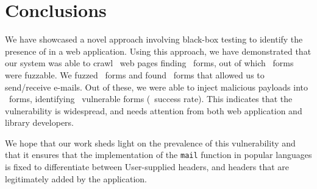\section{Conclusions}
\vspace{-2.5ex}
We have showcased a novel approach involving black-box testing to identify the presence of \ehi in a web application. Using this approach, we have demonstrated that our system was able to crawl \urls\ web pages finding \forms\ forms, out of which \emailforms\ forms were fuzzable. We fuzzed \fuzzed\ forms and found \recd\  forms that allowed us to send/receive e-mails. Out of these, we were able to inject malicious payloads into \malfuzzed\ forms, identifying \success\ vulnerable forms (\successDelta\ success rate). This indicates that the vulnerability is widespread, and needs attention from both web application and library developers. 

We hope that our work sheds light on the prevalence of this vulnerability and that it ensures that the implementation of the \texttt{mail} function in popular languages is fixed to differentiate between User-supplied headers, and headers that are legitimately added by the application.
